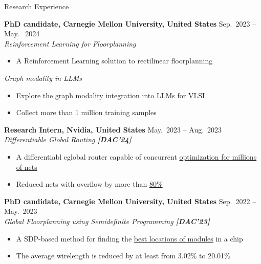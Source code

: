 
\begin{rSection}{Research Experience}

    {\bf PhD candidate, Carnegie Mellon University, United States}               \hfill { Sep.~2023 -- May.~ 2024} \\
    \textit{Reinforcement Learning for Floorplanning}
    \begin{itemize}[noitemsep,topsep=-5pt]
        \item A Reinforcement Learning solution to rectilinear floorplanning
    \end{itemize} 
    \textit{Graph modality in LLMs}
    \begin{itemize}[noitemsep,topsep=-5pt]
        \item Explore the graph modality integration into LLMs for VLSI
        \item Collect more than 1 million training samples
    \end{itemize} 
    {\bf Research Intern, Nvidia, United States}               \hfill { May.~2023 -- Aug.~2023} \\
    \textit{Differentiable Global Routing \textbf{[{{DAC'24}}]}}
    \begin{itemize}[noitemsep,topsep=-5pt]
        \item A differentiabl eglobal router capable of concurrent \underline{optimization for millions of nets}
        \item Reduced nets with overflow by more than \underline{80\%} \\
    \end{itemize} 

    {\bf PhD candidate, Carnegie Mellon University, United States}               \hfill { Sep.~2022 -- May.~2023} \\
    \textit{Global Floorplanning using Semidefinite Programming \textbf{[{{DAC'23}}]}} 
    \begin{itemize}[noitemsep,topsep=-5pt]
        \item A SDP-based method for finding the \underline{best locations of modules} in a chip
        \item The average wirelength is reduced by at least from 3.02\% to 20.01\% \\
    \end{itemize} 


\end{rSection}

